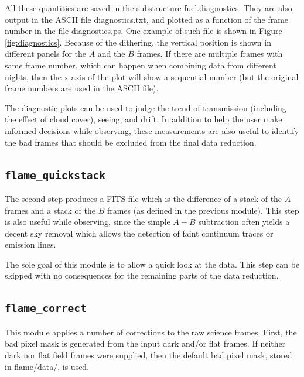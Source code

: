 \documentclass[a4paper, notitlepage]{article}
\begin{document}
All these quantities are saved in the substructure fuel.diagnostics. They are also output in the ASCII file diagnostics.txt, and plotted as a function of the frame number in the file diagnostics.ps. One example of such file is shown in Figure \ref{fig:diagnostics}. Because of the dithering, the vertical position is shown in different panels for the $A$ and the $B$ frames. If there are multiple frames with same frame number, which can happen when combining data from different nights, then the x axis of the plot will show a sequential number (but the original frame numbers are used in the ASCII file).

The diagnostic plots can be used to judge the trend of transmission (including the effect of cloud cover), seeing, and drift. In addition to help the user make informed decisions while observing, these measurements are also useful to identify the bad frames that should be excluded from the final data reduction.



\subsection{\texttt{flame\_quickstack}}

The second step produces a FITS file which is the difference of a stack of the $A$ frames and a stack of the $B$ frames (as defined in the previous module). This step is also useful while observing, since the simple $A-B$ subtraction often yields a decent sky removal which allows the detection of faint continuum traces or emission lines.

The sole goal of this module is to allow a quick look at the data. This step can be skipped with no consequences for the remaining parts of the data reduction.



\subsection{\texttt{flame\_correct}}

This module applies a number of corrections to the raw science frames. First, the bad pixel mask is generated from the input dark and/or flat frames. If neither dark nor flat field frames were supplied, then the default bad pixel mask, stored in flame/data/, is used.
\end{document}
